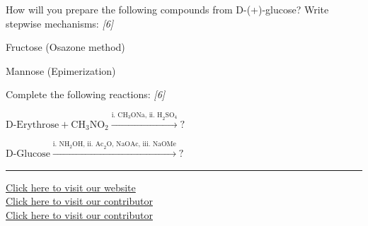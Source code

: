 \documentclass[11pt,a4paper]{article}
\newcommand{\pts}[1]{\hfill   \textit{[#1]}}
\begin{document}
\begin{parts}
  \item How will you prepare the following compounds from D-(+)-glucose? Write stepwise mechanisms: \pts{6}
  
\begin{parts}
    \item Fructose (Osazone method)
    \item Mannose (Epimerization)
  \end{parts}
  \item Complete the following reactions: \pts{6}
  
\begin{parts}
    \item $ \text{D-Erythrose} +  \text{CH}_3 \text{NO}_2 \xrightarrow{ \text{i. CH}_3 \text{ONa, ii. H}_2 \text{SO}_4} ?$
    \item $ \text{D-Glucose} \xrightarrow{ \text{i. NH}_2 \text{OH, ii. Ac}_2 \text{O, NaOAc, iii. NaOMe}} ?$
  \end{parts}
\end{parts}

\vfill
\rule{\linewidth}{0.4pt}

\begin{center}\small
  \href{https://bhu-exam.vercel.app/}{Click here to visit our website}\\[4pt]
  \href{https://me-aryan.vercel.app/}{Click here to visit our contributor}\\[4pt]
  \href{https://quashan-me.vercel.app/}{Click here to visit our contributor}
\end{center}
\end{document}
